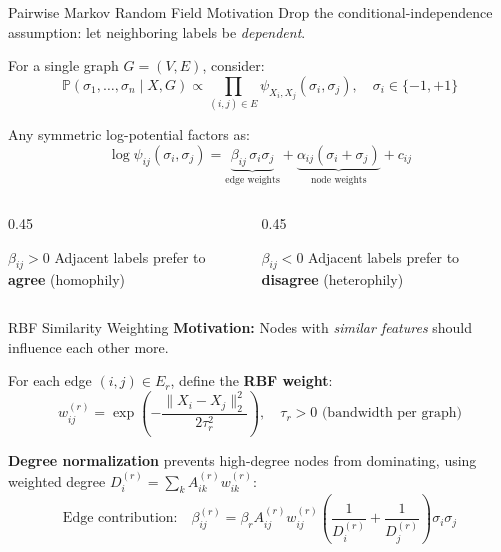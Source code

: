 \documentclass[10pt]{beamer}
\begin{document}
\begin{frame}{Pairwise Markov Random Field Motivation}
  Drop the conditional-independence assumption: let neighboring labels be \emph{dependent}.

  \vspace{0.5em}
  For a single graph $G=(V,E)$, consider:
  \[
    \mathbb{P}(\sigma_1,\ldots,\sigma_n \mid X, G)
    \propto
    \prod_{(i,j)\in E} \psi_{X_i, X_j}(\sigma_i, \sigma_j),
    \quad \sigma_i \in \{-1, +1\}
  \]

  \vspace{0.3em}
  Any symmetric log-potential factors as:
  \[
    \log \psi_{ij}(\sigma_i,\sigma_j)
    = \underbrace{\beta_{ij}\,\sigma_i\sigma_j}_{\text{edge weights}} + \underbrace{\alpha_{ij}(\sigma_i+\sigma_j)}_{\text{node weights}} + c_{ij}
  \]

  \begin{columns}[T]
    \begin{column}{0.45\textwidth}
      \begin{block}{$\beta_{ij} > 0$}
        Adjacent labels prefer to \textbf{agree} (homophily)
      \end{block}
    \end{column}
    \begin{column}{0.45\textwidth}
      \begin{block}{$\beta_{ij} < 0$}
        Adjacent labels prefer to \textbf{disagree} (heterophily)
      \end{block}
    \end{column}
  \end{columns}
\end{frame}

\begin{frame}{RBF Similarity Weighting}
  \textbf{Motivation:} Nodes with \emph{similar features} should influence each other more.

  \vspace{0.5em}
  For each edge $(i,j) \in E_r$, define the \textbf{RBF weight}:
  \[
    w_{ij}^{(r)} = \exp\left(-\frac{\|X_i - X_j\|_2^2}{2\tau_r^2}\right), \quad \tau_r > 0 \text{ (bandwidth per graph)}
  \]

  \vspace{0.4em}
  \textbf{Degree normalization} prevents high-degree nodes from dominating, using weighted degree $D_i^{(r)} = \sum_k A_{ik}^{(r)} w_{ik}^{(r)}$:
  \[
    \text{Edge contribution:} \quad \beta_{ij}^{(r)}=\beta_r
    A_{ij}^{(r)} w_{ij}^{(r)}\left(\frac{1}{D_i^{(r)}} + \frac{1}{D_j^{(r)}}\right)\sigma_i\sigma_j
  \]
\end{frame}
\end{document}
